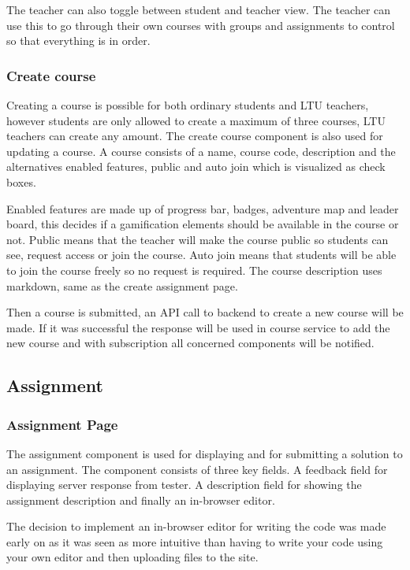 The teacher can also toggle between student and teacher view. The teacher can use this to go through their own courses with groups and assignments to control so that everything is in order. 

\subsubsection{Create course}
Creating a course is possible for both ordinary students  and LTU teachers, however students are only allowed to create a maximum of three courses, LTU teachers can create any amount. The create course component is also used for updating a course. A course consists of a name, course code, description and the alternatives enabled features, public and auto join which is visualized as check boxes.

Enabled features are made up of progress bar, badges, adventure map and leader board, this decides if a gamification elements should be available in the course or not. Public means that the teacher will make the course public so students can see, request access or join the course. Auto join means that students will be able to join the course freely so no request is required. The course description uses markdown, same as the create assignment page. 

Then a course is submitted, an API call to backend to create a new course will be made. If it was successful the response will be used in course service to add the new course and with subscription all concerned components will be notified. 

\subsection{Assignment}
\subsubsection{Assignment Page}
The assignment component is used for displaying and for submitting a solution to an assignment. The component consists of three key fields. A feedback field for displaying server response from tester. A description field for showing the assignment description and finally an in-browser editor. 

The decision to implement an in-browser editor for writing the code was made early on as it was seen as more intuitive than having to write your code using your own editor and then uploading files to the site.

